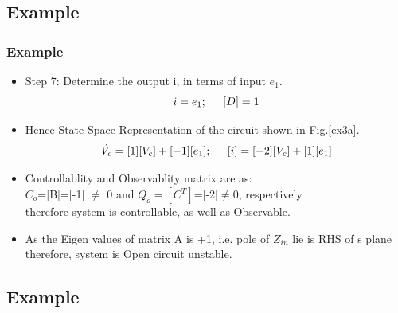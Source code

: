 \documentclass{beamer}
\begin{document}
\subsection*{Example}

\begin{frame}
\frametitle{Example}
\begin{small}

        \begin{itemize}
\item Step 7: Determine the output i, in terms of input $e_1$.
\begin{equation}
i=e_{1};\hspace{0.2in}[D]=1
\end{equation} 
         
\item Hence State Space Representation of the circuit shown in Fig.\ref{ex3a}.\\
\begin{equation}
 \dot{V_c}=[1][V_c]+[-1][e_1];\hspace{0.2in}[i]=[-2][V_c]+[1][e_1]
\end{equation}
\item Controllablity and Observablity matrix are as:\\

 $C_o$=[B]=[-1] $\neq$ 0 and $Q_o=[C^T]$=[-2]$\neq 0$, respectively \\

therefore system is controllable, as well as Observable. 
\item As the Eigen values of matrix A is +1, i.e. pole of $Z_{in}$ lie is RHS of s plane therefore, system is Open circuit unstable.
\end{itemize}
\end{small}
\end{frame}




\subsection*{Example}
\end{document}
